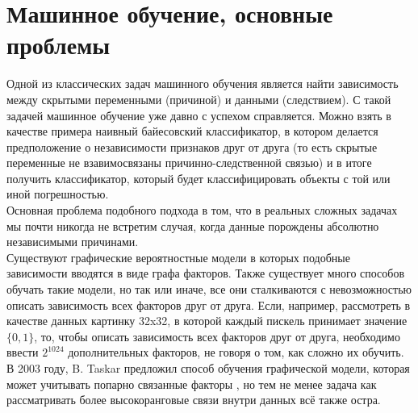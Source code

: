 \documentclass[a4paper,10pt]{article}
\begin{document}
\section{Машинное обучение, основные проблемы}
\label{sec:ml}
Одной из классических задач машинного обучения является найти зависимость между скрытыми переменными (причиной) и данными (следствием). С такой задачей машинное обучение уже давно с успехом справляется. Можно взять в качестве примера наивный байесовский классификатор, в котором делается предположение о независимости признаков друг от друга (то есть скрытые переменные не взавимосвязаны причинно-следственной связью) и в итоге получить классификатор, который будет классифицировать объекты с той или иной погрешностью.\\
\indent Основная проблема подобного подхода в том, что в реальных сложных задачах мы почти никогда не встретим случая, когда данные порождены абсолютно независимыми причинами.\\
\indent Существуют графические вероятностные модели \cite{prob_graph} в которых подобные зависимости вводятся в виде графа факторов. Также существует много способов обучать такие модели, но так или иначе, все они сталкиваются с невозможностью описать зависимость всех факторов друг от друга. Если, например, рассмотреть в качестве данных картинку 32x32, в которой каждый пискель принимает значение $\{0,1\}$, то, чтобы описать зависимость всех факторов друг от друга, необходимо ввести $2^{1024}$ дополнительных факторов, не говоря о том, как сложно их обучить.\\
\indent В 2003 году, B. Taskar предложил способ обучения графической модели, которая может учитывать попарно связанные факторы \cite{taskar}, но тем не менее задача как рассматривать более высокоранговые связи внутри данных всё также остра.
\end{document}
